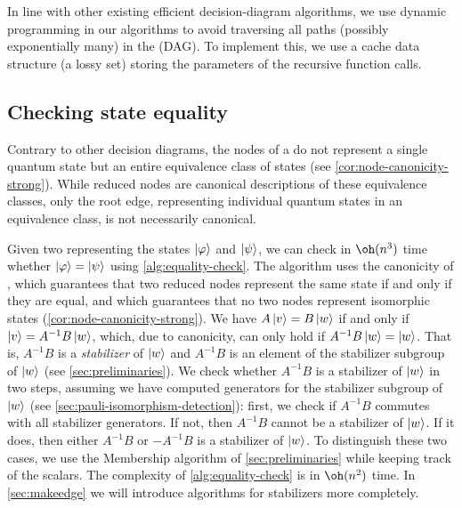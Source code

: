 In line with other existing efficient decision-diagram algorithms, we use dynamic programming in our algorithms to avoid traversing all paths  (possibly exponentially many) in the \limdd (DAG).
To implement this, we use a cache data structure (a lossy set) storing the parameters of the recursive function calls.



%


\subsection{Checking state equality}
\label{sec:equality}

Contrary to other decision diagrams, the nodes of a \limdd do not represent a single quantum state but an entire equivalence class of states (see \autoref{cor:node-canonicity-strong}). While reduced nodes are canonical descriptions of these equivalence classes, only the root edge, representing individual quantum states in an equivalence class, is not necessarily canonical.

Given two \limdds representing the states $\ket{\varphi}$ and $\ket{\psi}$, we can check in $\oh(n^3)$ time whether $\ket{\varphi}=\ket{\psi}$ using \autoref{alg:equality-check}.
The algorithm uses the canonicity of \limdds, which guarantees that two reduced nodes represent the same state if and only if they are equal, and which guarantees that no two nodes represent isomorphic states (\autoref{cor:node-canonicity-strong}).
We have $A\ket{v}=B\ket{w}$ if and only if $\ket{v}=A^{-1}B\ket{w}$, which, due to canonicity, can only hold if $A^{-1}B\ket{w}=\ket{w}$.
That is, $A^{-1} B$ is a \emph{stabilizer} of $\ket{w}$ and $A^{-1}B$ is an element of the stabilizer subgroup of $\ket{w}$ (see \autoref{sec:preliminaries}).
We check whether $A^{-1}B$ is a stabilizer of $\ket{w}$ in two steps, assuming we have computed generators for the stabilizer subgroup of $\ket{w}$ (see \autoref{sec:pauli-isomorphism-detection}): first, we check if $A^{-1}B$ commutes with all stabilizer generators. If not, then $A^{-1}B$ cannot be a stabilizer of $\ket{w}$.
If it does, then either $A^{-1}B$ or $-A^{-1}B$ is a stabilizer of $\ket{w}$.
To distinguish these two cases, we use the Membership algorithm of \autoref{sec:preliminaries} while keeping track of the scalars.
The complexity of \autoref{alg:equality-check} is in $\oh(n^2)$ time.
In \autoref{sec:makeedge} we will introduce algorithms for stabilizers more completely.


